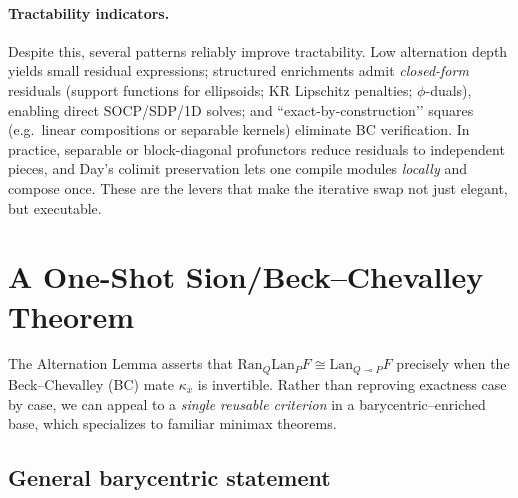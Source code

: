 \documentclass[11pt]{article}
\numberwithin{equation}{section}
\theoremstyle{upright}
\newcommand{\Lan}{\mathrm{Lan}}
\newcommand{\Ran}{\mathrm{Ran}}
\newcommand{\resid}{\multimap}
\begin{document}
\paragraph{Tractability indicators.}
Despite this, several patterns reliably improve tractability. Low alternation depth yields small residual expressions; structured enrichments admit \emph{closed-form} residuals (support functions for ellipsoids; KR Lipschitz penalties; $\phi$-duals), enabling direct SOCP/SDP/1D solves; and “exact-by-construction’’ squares (e.g.\ linear compositions or separable kernels) eliminate BC verification. In practice, separable or block-diagonal profunctors reduce residuals to independent pieces, and Day’s colimit preservation lets one compile modules \emph{locally} and compose once. These are the levers that make the iterative swap not just elegant, but executable.

\section{A One-Shot Sion/Beck--Chevalley Theorem}
\label{sec:one-shot-BC}

The Alternation Lemma asserts that $\Ran_Q\Lan_PF \cong \Lan_{Q\resid P}F$
precisely when the Beck--Chevalley (BC) mate $\kappa_x$ is invertible. 
Rather than reproving exactness case by case, we can appeal to a
\emph{single reusable criterion} in a barycentric--enriched base,
which specializes to familiar minimax theorems.

\subsection{General barycentric statement}
\end{document}
